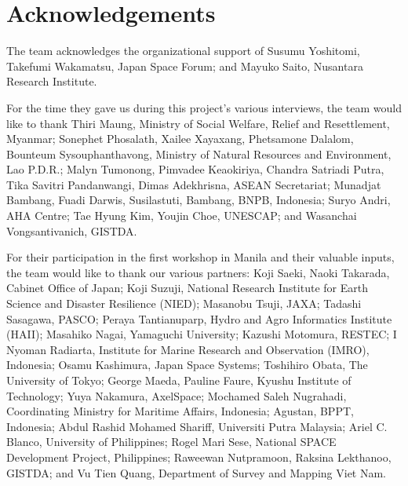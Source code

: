 \chapter*{Acknowledgements}

\tab The team acknowledges the organizational support of Susumu Yoshitomi, Takefumi Wakamatsu, Japan Space Forum; and Mayuko Saito, Nusantara Research Institute.

\vspace{0.4 cm}

For the time they gave us during this project's various interviews, the team would like to thank Thiri Maung, Ministry of Social Welfare, Relief and Resettlement, Myanmar; Sonephet Phosalath, Xailee Xayaxang, Phetsamone Dalalom, Bounteum Sysouphanthavong, Ministry of Natural Resources and Environment, Lao P.D.R.; Malyn Tumonong, Pimvadee Keaokiriya, Chandra Satriadi Putra, Tika Savitri Pandanwangi, Dimas Adekhrisna, ASEAN Secretariat; Munadjat Bambang, Fuadi Darwis, Susilastuti, Bambang, BNPB, Indonesia; Suryo Andri, AHA Centre; Tae Hyung Kim, Youjin Choe, UNESCAP; and Wasanchai Vongsantivanich, GISTDA.


\vspace{0.4 cm}

For their participation in the first workshop in Manila and their valuable inputs, the team would like to thank our various partners: Koji Saeki, Naoki Takarada, Cabinet Office of Japan; Koji Suzuji, National Research Institute for Earth Science and Disaster Resilience (NIED); Masanobu Tsuji, JAXA; Tadashi Sasagawa, PASCO; Peraya Tantianuparp, Hydro and Agro Informatics Institute (HAII); Masahiko Nagai, Yamaguchi University; Kazushi Motomura, RESTEC; I Nyoman Radiarta, Institute for Marine Research and Observation (IMRO), Indonesia; Osamu Kashimura, Japan Space Systems; Toshihiro Obata, The University of Tokyo; George Maeda, Pauline Faure, Kyushu Institute of Technology; Yuya Nakamura, AxelSpace; Mochamed Saleh Nugrahadi, Coordinating Ministry for Maritime Affairs, Indonesia; Agustan, BPPT, Indonesia; Abdul Rashid Mohamed Shariff, Universiti Putra Malaysia; Ariel C. Blanco, University of Philippines; Rogel Mari Sese, National SPACE Development Project, Philippines; Raweewan Nutpramoon, Raksina Lekthanoo, GISTDA; and Vu Tien Quang, Department of Survey and Mapping Viet Nam.

\vspace{0.4 cm}

